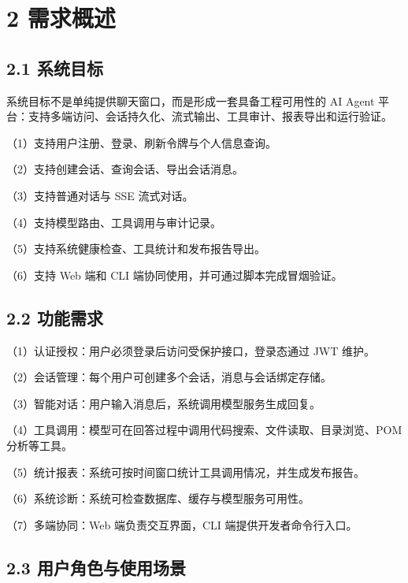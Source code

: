 \documentclass[UTF8]{ctexart}
\begin{document}
\section{\texorpdfstring{\textbf{2
需求概述}}{2 需求概述}}\label{ux9700ux6c42ux6982ux8ff0}

\subsection{\texorpdfstring{\textbf{2.1
系统目标}}{2.1 系统目标}}\label{ux7cfbux7edfux76eeux6807}

系统目标不是单纯提供聊天窗口，而是形成一套具备工程可用性的 AI Agent
平台：支持多端访问、会话持久化、流式输出、工具审计、报表导出和运行验证。

（1）支持用户注册、登录、刷新令牌与个人信息查询。

（2）支持创建会话、查询会话、导出会话消息。

（3）支持普通对话与 SSE 流式对话。

（4）支持模型路由、工具调用与审计记录。

（5）支持系统健康检查、工具统计和发布报告导出。

（6）支持 Web 端和 CLI 端协同使用，并可通过脚本完成冒烟验证。

\subsection{\texorpdfstring{\textbf{2.2
功能需求}}{2.2 功能需求}}\label{ux529fux80fdux9700ux6c42}

（1）认证授权：用户必须登录后访问受保护接口，登录态通过 JWT 维护。

（2）会话管理：每个用户可创建多个会话，消息与会话绑定存储。

（3）智能对话：用户输入消息后，系统调用模型服务生成回复。

（4）工具调用：模型可在回答过程中调用代码搜索、文件读取、目录浏览、POM
分析等工具。

（5）统计报表：系统可按时间窗口统计工具调用情况，并生成发布报告。

（6）系统诊断：系统可检查数据库、缓存与模型服务可用性。

（7）多端协同：Web 端负责交互界面，CLI 端提供开发者命令行入口。

\subsection{\texorpdfstring{\textbf{2.3
用户角色与使用场景}}{2.3 用户角色与使用场景}}\label{ux7528ux6237ux89d2ux8272ux4e0eux4f7fux7528ux573aux666f}
\end{document}
